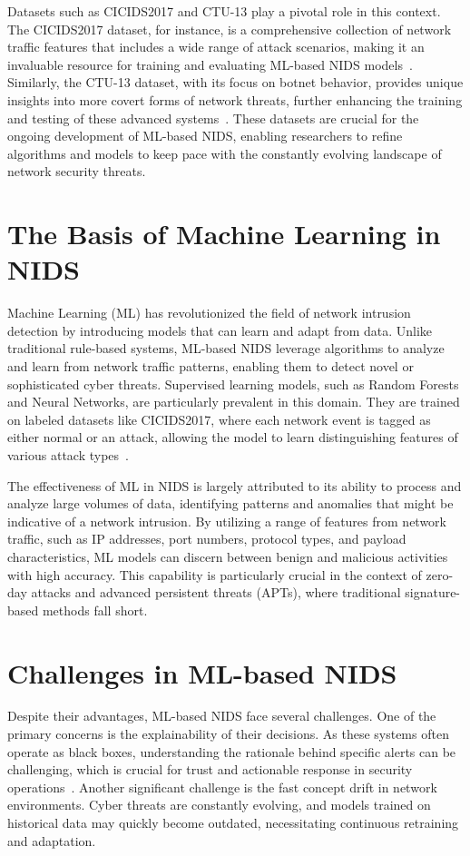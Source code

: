 Datasets such as CICIDS2017 and CTU-13 play a pivotal role in this context. The CICIDS2017 dataset, for instance, 
is a comprehensive collection of network traffic features that includes a wide range of attack scenarios, making it 
an invaluable resource for training and evaluating ML-based NIDS models~\cite{stiawan2020cicids}. Similarly, the CTU-13 
dataset, with its focus on botnet behavior, provides unique insights into more covert forms of network threats, 
further enhancing the training and testing of these advanced systems~\cite{garcia2014empirical}. These datasets are crucial for 
the ongoing development of ML-based NIDS, enabling researchers to refine algorithms and models to keep pace with the 
constantly evolving landscape of network security threats.

\section{The Basis of Machine Learning in NIDS}
Machine Learning (ML) has revolutionized the field of network intrusion detection by introducing models that can learn and adapt from data. Unlike traditional rule-based systems, ML-based NIDS leverage algorithms to analyze and learn from network traffic patterns, enabling them to detect novel or sophisticated cyber threats. Supervised learning models, such as Random Forests and Neural Networks, are particularly prevalent in this domain. They are trained on labeled datasets like CICIDS2017, where each network event is tagged as either normal or an attack, allowing the model to learn distinguishing features of various attack types~\cite{sharafaldin2018toward}.

The effectiveness of ML in NIDS is largely attributed to its ability to process and analyze large volumes of data, identifying patterns and anomalies that might be indicative of a network intrusion. By utilizing a range of features from network traffic, such as IP addresses, port numbers, protocol types, and payload characteristics, ML models can discern between benign and malicious activities with high accuracy. This capability is particularly crucial in the context of zero-day attacks and advanced persistent threats (APTs), where traditional signature-based methods fall short.

\section{Challenges in ML-based NIDS}
Despite their advantages, ML-based NIDS face several challenges. One of the primary concerns is the explainability of their decisions. As these systems often operate as black boxes, understanding the rationale behind specific alerts can be challenging, which is crucial for trust and actionable response in security operations~\cite{garcia2014empirical}. Another significant challenge is the fast concept drift in network environments. Cyber threats are constantly evolving, and models trained on historical data may quickly become outdated, necessitating continuous retraining and adaptation.


